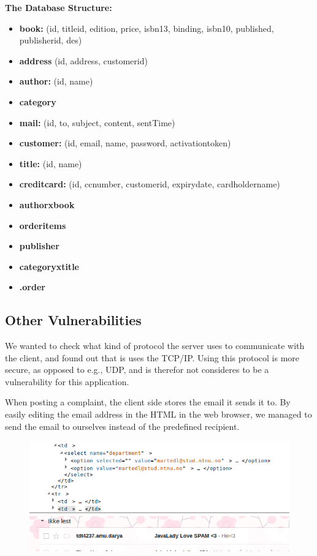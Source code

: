 {\bf The Database Structure:}
\begin{itemize}
	\item {\bf book:} (id, title\textunderscore id, edition, price, isbn13, binding, isbn10, published, publisher\textunderscore id, des)
	\item {\bf address} (id, address, customer\textunderscore id)
	\item {\bf author:} (id, name)
	\item {\bf category}
	\item {\bf mail:} (id, to, subject, content, sentTime)
	\item {\bf customer:} (id, email, name, password, activation\textunderscore token)
	\item {\bf title:} (id, name)
	\item {\bf credit\textunderscore card:} (id, cc\textunderscore number, customer\textunderscore id, expiry\textunderscore date, cardholder\textunderscore name)
	\item {\bf author\textunderscore x\textunderscore book}
	\item {\bf order\textunderscore items}
	\item {\bf publisher}
	\item {\bf category\textunderscore x\textunderscore title}
	\item {\bf .order}
\end{itemize}

\newpage

\subsection{Other Vulnerabilities}
We wanted to check what kind of protocol the server uses to communicate with the client, and found out that is uses the TCP/IP. Using this protocol is more secure, as opposed to e.g., UDP, and is therefor not consideres to be a vulnerability for this application.

When posting a complaint, the client side stores the email it sends it to. By easily editing the email address in the HTML in the web browser, we managed to send the email to ourselves instead of the predefined recipient.

\begin{figure}[!ht]
  \includegraphics[scale=0.5]{pics/screen7.png}
  \includegraphics[scale=0.5]{pics/screen8.png}
\end{figure}

